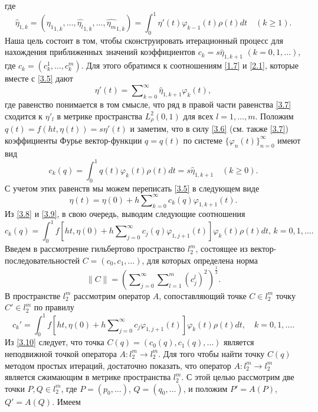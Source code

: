 где
  \begin{equation}\label{3.6}
\hat \eta_{1,k}=(\widehat{\eta_1}_{1,k},\ldots,\widehat {\eta_l}_{1,k},\ldots,\widehat{\eta_m}_{1,k})=\int_{0}^1 \eta'(t)\varphi_{k-1}(t)\rho(t)dt\quad(k\ge1).
\end{equation}
Наша цель состоит в том, чтобы сконструировать итерационный процесс для нахождения приближенных значений коэффициентов $c_k=s\hat \eta_{1,k+1}$ $(k=0,1,\ldots)$, где $c_k=(c_k^1,\ldots,c_k^m)$. Для этого обратимся к соотношениям \eqref{1.7} и \eqref{2.1}, которые вместе с \eqref{3.5} дают
\begin{equation}\label{3.7}
\eta'(t)=  \sum\nolimits_{k=0}^\infty \hat \eta_{1,k+1}\varphi_k(t),
\end{equation}
где равенство понимается в том смысле, что ряд в правой части равенства \eqref{3.7} сходится к $\eta'_l$ в метрике пространства $L^2_{\rho}(0,1)$ для всех $l=1,\ldots,m$. Положим $q(t)=f(ht,\eta(t))=s\eta'(t)$ и заметим, что в силу  \eqref{3.6} (см. также \eqref{3.7}) коэффициенты Фурье вектор-функции $q=q(t)$ по системе  $\{\varphi_{n}(t)\}_{n=0}^\infty$ имеют вид
\begin{equation}\label{3.8}
 c_k(q)=\int_{0}^1 q(t)\varphi_{k}(t)\rho(t)dt=s\hat \eta_{1,k+1} \quad (k\ge0).
\end{equation}
С учетом этих равенств мы можем переписать \eqref{3.5} в следующем виде
\begin{equation}\label{3.9}
\eta(t)= \eta(0)+ h\sum\nolimits_{k=0}^\infty c_k(q){\varphi}_{1,k+1}(t).
\end{equation}
Из  \eqref{3.8} и \eqref{3.9}, в свою очередь, выводим следующие соотношения
\begin{equation}\label{3.10}
c_k(q)=\int_{0}^1f\left[ht,\eta(0)+ h\sum\nolimits_{j=0}^\infty c_j(q)\varphi_{1,j+1}(t)\right]\varphi_k(t)\rho(t) dt,\, k=0,1,\ldots.
\end{equation}
Введем в рассмотрение гильбертово пространство $l_2^m$, состоящее из вектор-после\-дователь\-ностей $C=(c_0,c_1,\ldots)$, для которых определена норма
$$\|C\|=\left(\sum\nolimits_{j=0}^\infty \sum\nolimits_{l=1}^{m}(c_j^l)^2\right)^\frac12.$$  В пространстве $l_2^m$ рассмотрим оператор $A$, сопоставляющий точке $C\in l_2^m$ точку $C'\in l_2^m$ по правилу
\begin{equation}\label{3.11}
c_k'=\int_{0}^1f\left[ht,\eta(0)+ h\sum\nolimits_{j=0}^\infty c_j
\varphi_{1,j+1}(t)\right]\varphi_k(t)\rho(t) dt,\quad k=0,1,\ldots.
\end{equation}
Из  \eqref{3.10} следует, что точка $C(q)=(c_0(q),c_1(q),\ldots)$ является неподвижной точкой оператора $A:l_2^m\to l_2^m$. Для того чтобы найти точку $C(q)$ методом простых итераций, достаточно показать, что оператор $A:l_2^m\to l_2^m$ является сжимающим в метрике пространства $l_2^m$. С этой целью рассмотрим две точки $P,Q\in l_2^m$, где $P=(p_0,\ldots)$, $Q=(q_0,\ldots)$, и положим $P'=A(P)$, $Q'=A(Q)$. Имеем
